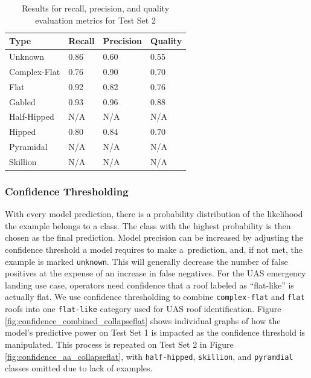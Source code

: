 \begin{table}[H]
     \caption{Results for recall, precision, and quality evaluation metrics for Test Set 2}
    \label{table:quality_metrics2}
      \centering
      \begin{tabular}{llll}
        \toprule

      
      \textbf{  Type }       & \textbf{Recall} & \textbf{Precision }& \textbf{Quality} \\ \midrule
        Unknown     & 0.86   & 0.60  & 0.55  \\
        Complex-Flat& 0.76  & 0.90  & 0.70  \\
        Flat        & 0.92   & 0.82  & 0.76 \\
        Gabled      & 0.93   & 0.96  & 0.88  \\
        Half-Hipped & N/A    & N/A  & N/A  \\
        Hipped      & 0.80   & 0.84  & 0.70  \\
        Pyramidal   & N/A    & N/A   & N/A  \\
        Skillion   & N/A    & N/A   & N/A  \\
        \bottomrule
        \end{tabular}
                  
\end{table}






\subsubsection{Confidence Thresholding}\label{section:confidence}

 With every model prediction, there is a probability distribution of the likelihood the example belongs to a class. The class with the highest probability is then chosen as the final prediction. Model precision can be increased by adjusting the confidence threshold a model requires to make a~prediction, and, if not met, the example is marked \texttt{unknown}.  This will generally decrease the number of false positives at the expense of an increase in false negatives. For the UAS emergency landing use case, operators need confidence that a roof labeled as ``flat-like'' is actually flat.  We use confidence thresholding to combine \texttt{complex-flat} and \texttt{flat} roofs into one \texttt{flat-like} category used for UAS roof identification.  Figure \ref{fig:confidence_combined_collapseflat} shows individual graphs of how the model's predictive power on Test Set     1 is impacted as the confidence threshold is manipulated. This process is repeated on Test Set     2 in Figure \ref{fig:confidence_aa_collapseflat}, with \texttt{half-hipped}, \texttt{skillion}, and \texttt{pyramdial} classes omitted due to lack of examples. 

